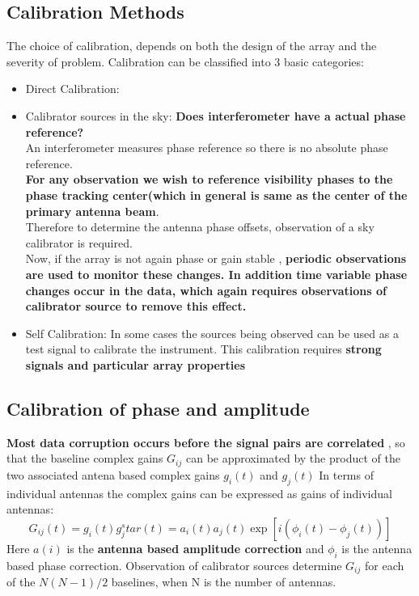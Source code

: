 \documentclass[10pt]{report}
\newcommand{\tbf}[1]{\textbf{#1}}
\newcommand{\cc}[1]{\left({#1}\right)}
\newcommand{\rr}[1]{\left[{#1}\right]}
\begin{document}
\subsection{Calibration Methods}
The choice of calibration, depends on both the design of the array and the severity of problem. Calibration can be classified into 3 basic categories:
\begin{itemize}
\item Direct Calibration:
\item Calibrator sources in the sky: 
\tbf{Does interferometer have a  actual phase reference?}\\
An interferometer measures phase reference so there is no absolute phase reference.\\

\tbf{For any observation we wish to reference visibility phases to the phase tracking center(which in general is same as the center of the primary antenna beam}.\\

Therefore to determine the antenna phase offsets, observation of a sky calibrator is required.\\

Now, if the array is not again phase or gain stable , \tbf{periodic observations are used to monitor these changes. In addition time variable phase changes occur in the data, which again requires observations of calibrator source to remove this effect.}

\item Self Calibration: In some cases the sources being observed can be used as a test signal to calibrate the instrument. This calibration requires \tbf{strong signals and particular array properties}
\end{itemize}


\subsection{Calibration of phase and amplitude}
\tbf{Most data corruption occurs before the signal pairs are correlated} , so that the baseline complex gains $G_{ij}$ can be approximated by the product of the two associated antena based complex gains $g_i (t)$ and $g_j(t)$
In terms of individual antennas the complex gains can be expressed as gains of individual antennas:
\begin{equation}
G_{ij}(t)=g_i(t)g_j^star(t)=a_i(t)a_j(t)\exp{\rr{i\cc{\phi_i(t)-\phi_j(t)}}}
\end{equation}
Here $a(i)$ is the \textbf{antenna based amplitude correction} and $\phi_i$ is the antenna based phase correction. Observation of calibrator sources determine $G_{ij}$ for each of the $N(N-1)/2$ baselines, when N is the number of antennas.
\end{document}
